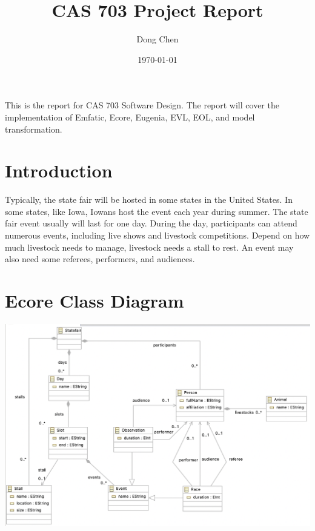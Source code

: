 \documentclass[12pt]{article}
\title{CAS 703 Project Report}
\author{Dong Chen}
\date{\today}
\begin{document}
\maketitle
This is the report for CAS 703 Software Design. The report will cover the implementation of 
Emfatic, Ecore, Eugenia, EVL, EOL, and model transformation.

\section{Introduction}
Typically, the state fair will be hosted in some states in the United States. In some states, 
like Iowa, Iowans host the event each year during summer. The state fair event usually will 
last for one day. During the day, participants can attend numerous events, including live shows 
and livestock competitions. Depend on how much livestock needs to manage, livestock needs a stall 
to rest. An event may also need some referees, performers, and audiences.

\section{Ecore Class Diagram}
\includegraphics[scale = 0.6]{img/statefair-diagram}
\end{document}
